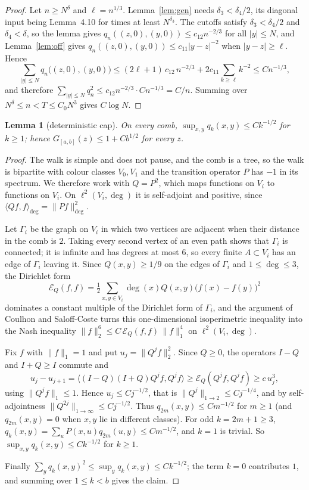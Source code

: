 \documentclass[11pt]{amsart}
\newtheorem{lemma}[theorem]{Lemma}
\theoremstyle{remark}
\numberwithin{equation}{section}
\begin{document}
\begin{proof}
Let $n\ge N^\delta$ and $\ell=n^{1/3}$. Lemma~\ref{lem:gen} needs $\delta_3<\delta_4/2$, its diagonal input being Lemma~4.10 for times at least $N^{\delta_3}$. The cutoffs satisfy $\delta_3<\delta_4/2$ and $\delta_4<\delta$, so the lemma gives $q_n((z,0),(y,0))\le c_{12}n^{-2/3}$ for all $|y|\le N$, and Lemma~\ref{lem:off} gives $q_n((z,0),(y,0))\le c_{11}|y-z|^{-2}$ when $|y-z|\ge\ell$. Hence
\[
\sum_{|y|\le N} q_n\bigl((z,0),(y,0)\bigr)\le(2\ell+1)\,c_{12}\,n^{-2/3}+2c_{11}\sum_{k\ge\ell}k^{-2}\le C n^{-1/3},
\]
and therefore $\sum_{|y|\le N}q_n^2\le c_{12}n^{-2/3}\cdot Cn^{-1/3}=C/n$. Summing over $N^\delta\le n<T\le C_0N^3$ gives $C\log N$.
\end{proof}

\begin{lemma}[deterministic cap]\label{lem:cap}
On every comb, $\sup_{x,y}q_k(x,y)\le Ck^{-1/2}$ for $k\ge1$; hence $G_{[a,b]}(z)\le 1+Cb^{1/2}$ for every $z$.
\end{lemma}

\begin{proof}
The walk is simple and does not pause, and the comb is a tree, so the walk is bipartite with colour classes $V_0,V_1$ and the transition operator $P$ has $-1$ in its spectrum. We therefore work with $Q=P^2$, which maps functions on $V_i$ to functions on $V_i$. On $\ell^2(V_i,\deg)$ it is self-adjoint and positive, since $\langle Qf,f\rangle_{\deg}=\|Pf\|_{\deg}^2$.

Let $\Gamma_i$ be the graph on $V_i$ in which two vertices are adjacent when their distance in the comb is $2$. Taking every second vertex of an even path shows that $\Gamma_i$ is connected; it is infinite and has degrees at most $6$, so every finite $A\subset V_i$ has an edge of $\Gamma_i$ leaving it. Since $Q(x,y)\ge1/9$ on the edges of $\Gamma_i$ and $1\le\deg\le3$, the Dirichlet form
\[
\mathcal E_Q(f,f)=\tfrac12\sum_{x,y\in V_i}\deg(x)Q(x,y)\bigl(f(x)-f(y)\bigr)^2
\]
dominates a constant multiple of the Dirichlet form of $\Gamma_i$, and the argument of Coulhon and Saloff-Coste \cite{CSC} turns this one-dimensional isoperimetric inequality into the Nash inequality $\|f\|_2^6\le C\,\mathcal E_Q(f,f)\,\|f\|_1^4$ on $\ell^2(V_i,\deg)$.

Fix $f$ with $\|f\|_1=1$ and put $u_j=\|Q^jf\|_2^2$. Since $Q\ge0$, the operators $I-Q$ and $I+Q\ge I$ commute and
\[
u_j-u_{j+1}=\bigl\langle(I-Q)(I+Q)Q^jf,Q^jf\bigr\rangle\ge\mathcal E_Q(Q^jf,Q^jf)\ge c\,u_j^3,
\]
using $\|Q^jf\|_1\le1$. Hence $u_j\le Cj^{-1/2}$, that is $\|Q^j\|_{1\to2}\le Cj^{-1/4}$, and by self-adjointness $\|Q^{2j}\|_{1\to\infty}\le Cj^{-1/2}$. Thus $q_{2m}(x,y)\le Cm^{-1/2}$ for $m\ge1$ (and $q_{2m}(x,y)=0$ when $x,y$ lie in different classes). For odd $k=2m+1\ge3$, $q_k(x,y)=\sum_uP(x,u)q_{2m}(u,y)\le Cm^{-1/2}$, and $k=1$ is trivial. So $\sup_{x,y}q_k(x,y)\le Ck^{-1/2}$ for $k\ge1$.

Finally $\sum_y q_k(x,y)^2\le\sup_y q_k(x,y)\le Ck^{-1/2}$; the term $k=0$ contributes $1$, and summing over $1\le k<b$ gives the claim.
\end{proof}
\end{document}
